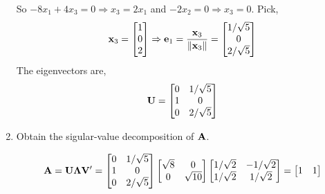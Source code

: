\begin{enumerate}[label=(\alph*)]
\[            \]
            So $-8x_1 + 4x_3 = 0 \Rightarrow x_3 = 2x_1$ and $-2x_2 = 0 \Rightarrow x_3 = 0$. Pick,
            \[
                \bold{x}_3
                =
                \begin{bmatrix}
                    1 \\
                    0 \\
                    2
                \end{bmatrix}
                \Rightarrow
                \bold{e}_1
                =
                \frac{\bold{x}_3}{\left\|\bold{x}_3\right\|}
                =
                \begin{bmatrix}
                    1/\sqrt{5} \\
                    0 \\
                    2/\sqrt{5}
                \end{bmatrix}
            \]
            The eigenvectors are,
            \[
                \bold{U}
                =
                \begin{bmatrix}
                    0 & 1/\sqrt{5} \\
                    1 & 0 \\
                    0 & 2/\sqrt{5}
                \end{bmatrix}
            \]
            \item Obtain the sigular-value decomposition of $\bold{A}$.
            \par
            \[
                \bold{A} = \bold{U}\bold{\Lambda}\bold{V}^\prime
                =
                \begin{bmatrix}
                    0 & 1/\sqrt{5} \\
                    1 & 0 \\
                    0 & 2/\sqrt{5}
                \end{bmatrix}
                \begin{bmatrix}
                    \sqrt{8} & 0 \\
                    0 & \sqrt{10}
                \end{bmatrix}
                \begin{bmatrix}
                    1/\sqrt{2} & -1/\sqrt{2} \\
                    1/\sqrt{2} & 1/\sqrt{2}
                \end{bmatrix}
                =
                \begin{bmatrix}
                    1 & 1 \\

\end{bmatrix}\]
\end{enumerate}
